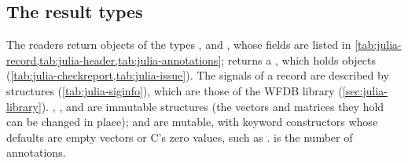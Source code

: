 \subsection{The result types}
\label{sec:julia-results}

The readers return objects of the types ,  and
, whose fields are listed in
\cref{tab:julia-record,tab:julia-header,tab:julia-annotations}; 
returns a , which holds  objects
(\cref{tab:julia-checkreport,tab:julia-issue}). The signals of a record are described by
 structures (\cref{tab:julia-siginfo}), which are those of the WFDB library
(\cref{sec:julia-library}). , ,  and
 are immutable structures (the vectors and matrices they hold can be changed
in place);  and  are mutable, with keyword constructors
whose defaults are empty vectors or C's zero values, such as .  is the number of annotations.

